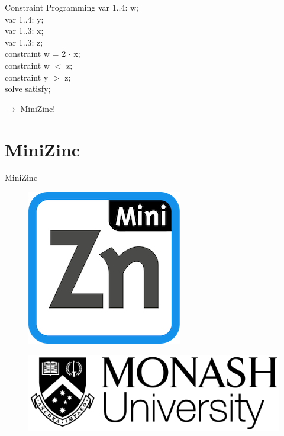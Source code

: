 \documentclass[mathserif,table]{gkibeamer-aaai}
\begin{document}
\begin{frame}{Constraint Programming}
	\hspace{2cm}
	var 1..4: w; \\
	\hspace{2cm}
	var 1..4: y; \\
	\hspace{2cm}
	var 1..3: x; \\
	\hspace{2cm}
	var 1..3: z; \\
	\vspace{0.35cm}
	\hspace{2cm}
	constraint w = 2 $\cdot$ x; \\
	\hspace{2cm}
	constraint w $<$ z; \\
	\hspace{2cm}
	constraint y $>$ z; \\

	\pause
	\vspace{0.35cm}
	\hspace{2cm}
	solve satisfy;

	\pause
	\vspace{0.35cm}
	\hspace{2cm}
	$\rightarrow$ MiniZinc!
\end{frame}

\section{MiniZinc}

\begin{frame}{MiniZinc}
	\begin{figure}[ht]
		\includegraphics[scale=0.2]{./figures/minizinc_logo.png}
	\end{figure}
	\begin{figure}[ht]
		\includegraphics[scale=0.1]{./figures/monash_logo.png}
	\end{figure}
\end{frame}
\end{document}

